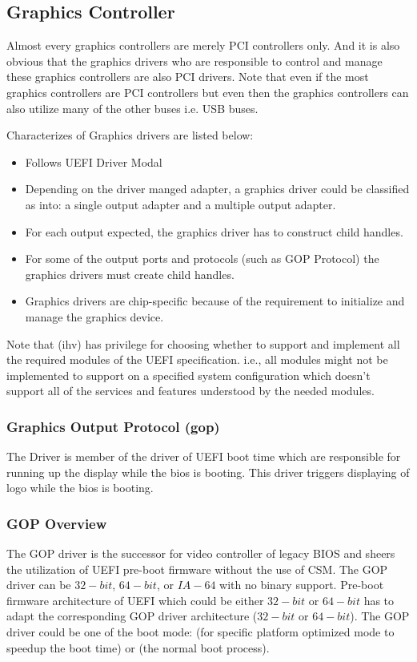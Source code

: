 \subsection{Graphics Controller}
Almost every graphics controllers are merely PCI controllers only. And it is also obvious that the graphics drivers who are responsible to control and manage these graphics controllers are also PCI drivers. Note that even if the most graphics controllers are PCI controllers but even then the graphics controllers can also utilize many of the other buses i.e. USB buses. 

Characterizes of Graphics drivers are listed below:
\begin{itemize}
	\item Follows UEFI Driver Modal
	\item Depending on the driver manged adapter, a graphics driver could be classified as into: a single output adapter and a multiple output adapter.
	\item For each output expected, the graphics driver has to construct child handles.
	\item For some of the output ports and protocols (such as GOP Protocol) the graphics drivers must create child handles.
	\item Graphics drivers are chip-specific because of the requirement to initialize and manage the graphics device.
\end{itemize}
Note that (\gls{ihv}) has privilege for choosing whether to support and implement all the required modules of the UEFI specification. i.e., all modules might not be implemented to support on a specified system configuration which doesn't support all of the services and features understood by the needed modules.

\subsubsection{Graphics Output Protocol (\gls{gop})}
The  Driver is member of the driver of UEFI boot time which are responsible for running up the display while the bios is booting. This driver triggers displaying of logo while the bios is booting.

\subsubsection{GOP Overview}
The GOP driver is the successor for video controller of legacy BIOS and sheers the utilization of UEFI pre-boot firmware without the use of CSM. The GOP driver can be $ 32-bit $, $ 64-bit $, or $ IA-64 $ with no binary support. Pre-boot firmware architecture of UEFI which could be either $ 32-bit $ or $ 64-bit $ has to adapt the corresponding GOP driver architecture ($ 32-bit $ or $ 64-bit $). The GOP driver could be one of the boot mode:  (for specific platform optimized mode to speedup the boot time) or  (the normal boot process).

